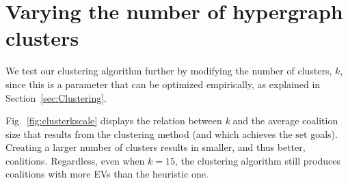 
\section{Varying the number of hypergraph clusters} \label{sec:results_modifications}
We test our clustering algorithm further by modifying the number of clusters, $k$, since this is a parameter that can be optimized empirically, as explained in Section~\ref{sec:Clustering}.

Fig.~\ref{fig:clusterkscale} displays the relation between \textit{k} and the average coalition size that results from the clustering method (and which achieves the set goals). Creating a larger number of clusters results in smaller, and thus better, coalitions. Regardless, even when $k=15$, the clustering algorithm still produces coalitions with more EVs than the heuristic one.%
